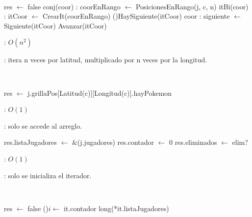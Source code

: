 \begin{Algoritmos}

	~

	\begin{algorithm}[H]
		\NoCaptionOfAlgo
		\caption{}
		\BlankLine
		res $\leftarrow$ false
		conj(coor) : coorEnRango $\leftarrow$ PosicionesEnRango(j, c, n)
		itBi(coor) : itCoor $\leftarrow$ CrearIt(coorEnRango)
		\While(){HaySiguiente(itCoor)}{
			coor : siguiente $\leftarrow$ Siguiente(itCoor)
			Avanzar(itCoor)
		}
	\end{algorithm}

	\complejidad: $O(n^2)$

	\justifcomp: itera n veces por latitud, multiplicado por n veces por la longitud.

	
	~

	\begin{algorithm}[H]
		\NoCaptionOfAlgo
		\caption{}
		\BlankLine
		res $\leftarrow$ j.grillaPos[Latitud(c)][Longitud(c)].hayPokemon
	\end{algorithm}

	\complejidad: $O(1)$

	\justifcomp: solo se accede al arreglo.


	\begin{algorithm}[H]
		\NoCaptionOfAlgo
		\caption{}
		res.listaJugadores $\leftarrow$ \&(j.jugadores)
		res.contador $\leftarrow$ 0
		res.eliminados $\leftarrow$ elim?
	\end{algorithm}

	\complejidad: $O(1)$

	\justifcomp: solo se inicializa el iterador.

	~

	\begin{algorithm}[H]
		\NoCaptionOfAlgo
		\caption{}
		res $\leftarrow$ false
		\For(){$i \leftarrow$ it.contador \KwTo long(*it.listaJugadores)}{
		}
	\end{algorithm}


\end{Algoritmos}
